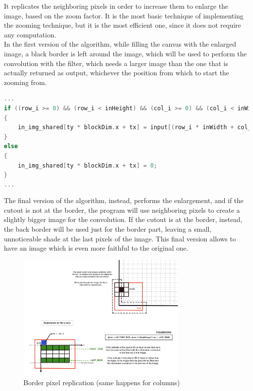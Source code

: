     It replicates the neighboring pixels in order to increase them to enlarge the image, based on the zoom factor. It is the most basic technique of implementing the
    zooming technique, but it is the most efficient one, since it does not require any computation.\\
    In the first version of the algorithm, while filling the canvas with the enlarged image, a black border is left around the image,
    which will be used to perform the convolution with the filter, which needs a larger image than the one that is actually returned as output, whichever
    the position from which to start the zooming from.

    \noindent\begin{lstlisting}[language=C]
...
if ((row_i >= 0) && (row_i < inHeight) && (col_i >= 0) && (col_i < inWidth))
{
    in_img_shared[ty * blockDim.x + tx] = input[(row_i * inWidth + col_i) * 3 + color];
}
else
{
    in_img_shared[ty * blockDim.x + tx] = 0;
}
...
    \end{lstlisting}

    The final version of the algorithm, instead, performs the enlargement, and if the cutout is not at the border, the program will use neighboring pixels
    to create a slightly bigger image for the convolution. If the cutout is at the border, instead, the back border will be used just for the border part, 
    leaving a small, unnoticeable shade at the last pixels of the image. This final version allows to have an image which is even more faithful to the original one.\\

    \begin{figure}
        \centering
        \includegraphics[width=0.75\textwidth]{img/EDGEscheme.png}
        \caption{Border pixel replication (same happens for columns)}
        \label{fig:borderrepl}
    \end{figure}


